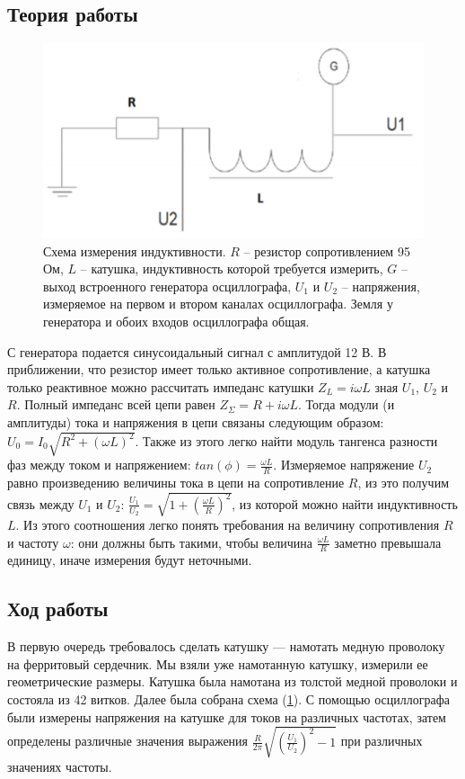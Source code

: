 \documentclass[a4paper,14pt]{extarticle}
\begin{document}
	\subsection{Теория работы}
	\begin{figure}[h]
		\centering
		\includegraphics[width=.75\linewidth]{схема.png}
		\caption{Схема измерения индуктивности. $R$ – резистор сопротивлением 95 Ом, $L$ – катушка, индуктивность которой требуется измерить, $G$ – выход встроенного	генератора осциллографа, $U_1$ и $U_2$ – напряжения, измеряемое на первом и втором каналах осциллографа. Земля у генератора и обоих входов осциллографа общая.}
		\label{fig1}
	\end{figure}
	\newpage
	С генератора подается синусоидальный сигнал с амплитудой 12 В. В приближении, что резистор имеет только активное сопротивление, а катушка только реактивное можно рассчитать импеданс катушки $Z_L = i \omega L$ зная $U_1$, $U_2$ и $R$. Полный импеданс всей цепи равен $Z_\Sigma =	R + i \omega L$. Тогда модули (и амплитуды) тока и напряжения в цепи связаны следующим образом: $U_0 = I_0 \sqrt{R^2 + (\omega L)^2}$. Также из этого легко найти модуль тангенса разности фаз между током и напряжением: $tan(\phi) = \frac{\omega L}{R}$. Измеряемое напряжение $U_2$ равно произведению величины тока в цепи на сопротивление $R$, из это получим связь между $U_1$ и $U_2$: $\frac{U_1}{U_2} = \sqrt{1 + (\frac{\omega L}{R})^2}$, из которой можно найти индуктивность $L$. Из этого соотношения легко понять требования на величину сопротивления $R$ и частоту $\omega$: они должны быть такими, чтобы величина $\frac{\omega L}{R}$ заметно превышала единицу, иначе измерения будут неточными.
	\subsection{Ход работы}
	В первую очередь требовалось сделать катушку — намотать медную проволоку на
	ферритовый сердечник. Мы взяли уже намотанную катушку, измерили ее геометрические размеры. Катушка была намотана из толстой медной проволоки и состояла из 42 витков.
	Далее была собрана схема (\ref{fig1}). С помощью осциллографа были измерены напряжения на катушке для токов на различных частотах, затем определены различные значения выражения $\frac{R}{2\pi}\sqrt{(\frac{U_1}{U_2})^2 - 1}$ при различных значениях частоты.
\end{document}

